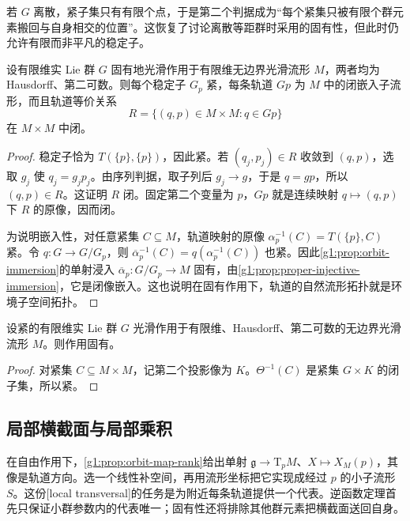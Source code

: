若 \(G\) 离散，紧子集只有有限个点，于是第二个判据成为“每个紧集只被有限个群元素搬回与自身相交的位置”。这恢复了讨论离散等距群时采用的固有性，但此时仍允许有限而非平凡的稳定子。

\begin{proposition}\label{g1:prop:proper-action-orbits}
	设有限维实 Lie 群 \(G\) 固有地光滑作用于有限维无边界光滑流形 \(M\)，两者均为 Hausdorff、第二可数。则每个稳定子 \(G_p\) 紧，每条轨道 \(Gp\) 为 \(M\) 中的闭嵌入子流形，而且轨道等价关系
	\[
		R=\{(q,p)\in M\times M:q\in Gp\}
	\]
	在 \(M\times M\) 中闭。
\end{proposition}
\begin{proof}
	稳定子恰为 \(T(\{p\},\{p\})\)，因此紧。若 \((q_j,p_j)\in R\) 收敛到 \((q,p)\)，选取 \(g_j\) 使 \(q_j=g_jp_j\)。由序列判据，取子列后 \(g_j\to g\)，于是 \(q=gp\)，所以 \((q,p)\in R\)。这证明 \(R\) 闭。固定第二个变量为 \(p\)，\(Gp\) 就是连续映射 \(q\mapsto(q,p)\) 下 \(R\) 的原像，因而闭。

	为说明嵌入性，对任意紧集 \(C\subseteq M\)，轨道映射的原像 \(\alpha_p^{-1}(C)=T(\{p\},C)\) 紧。令 \(q:G\to G/G_p\)，则 \(\overline\alpha_p^{-1}(C)=q(\alpha_p^{-1}(C))\) 也紧。因此\cref{g1:prop:orbit-immersion}的单射浸入 \(\overline\alpha_p:G/G_p\to M\) 固有，由\cref{g1:prop:proper-injective-immersion}，它是闭像嵌入。这也说明在固有作用下，轨道的自然流形拓扑就是环境子空间拓扑。
\end{proof}

\begin{proposition}\label{g1:prop:compact-group-action-proper}
	设紧的有限维实 Lie 群 \(G\) 光滑作用于有限维、Hausdorff、第二可数的无边界光滑流形 \(M\)。则作用固有。
\end{proposition}
\begin{proof}
	对紧集 \(C\subseteq M\times M\)，记第二个投影像为 \(K\)。\(\Theta^{-1}(C)\) 是紧集 \(G\times K\) 的闭子集，所以紧。
\end{proof}

\subsection{局部横截面与局部乘积}
\label{g1:subsec:1702:02}

在自由作用下，\cref{g1:prop:orbit-map-rank}给出单射 \(\mathfrak g\to \mathrm{T}_pM\)、\(X\mapsto X_M(p)\)，其像是轨道方向。选一个线性补空间，再用流形坐标把它实现成经过 \(p\) 的小子流形 \(S\)。这份[local transversal]的任务是为附近每条轨道提供一个代表。逆函数定理首先只保证小群参数内的代表唯一；固有性还将排除其他群元素把横截面送回自身。

